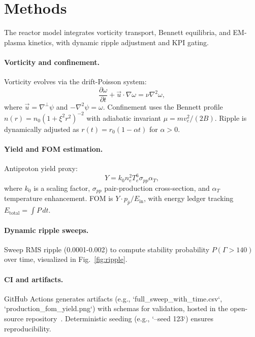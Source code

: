 \documentclass[11pt]{article}
\begin{document}
\section{Methods}
The reactor model integrates vorticity transport, Bennett equilibria, and EM-plasma kinetics, with dynamic ripple adjustment and KPI gating.

\paragraph{Vorticity and confinement.} Vorticity evolves via the drift-Poisson system:
\begin{equation}
\frac{\partial \omega}{\partial t} + \vec{u} \cdot \nabla \omega = \nu \nabla^2 \omega,
\end{equation}
where $\vec{u} = \nabla^\perp \psi$ and $-\nabla^2 \psi = \omega$. Confinement uses the Bennett profile $n(r)=n_0 (1 + \xi^2 r^2)^{-2}$ with adiabatic invariant $\mu = m v_c^2 / (2B)$. Ripple is dynamically adjusted as $r(t) = r_0 (1 - \alpha t)$ for $\alpha > 0$.

\paragraph{Yield and FOM estimation.} Antiproton yield proxy:
\begin{equation}
Y = k_0 n_e^2 T_e^6 \sigma_{pp} \alpha_T,
\end{equation}
where $k_0$ is a scaling factor, $\sigma_{pp}$ pair-production cross-section, and $\alpha_T$ temperature enhancement. FOM is $Y \cdot p_{\bar{p}} / E_{\text{in}}$, with energy ledger tracking $E_{\text{total}} = \int P \, dt$.

\paragraph{Dynamic ripple sweeps.} Sweep RMS ripple (0.0001-0.002) to compute stability probability $P(\Gamma > 140)$ over time, visualized in Fig.~\ref{fig:ripple}.

\paragraph{CI and artifacts.} GitHub Actions generates artifacts (e.g., `full\_sweep\_with\_time.csv`, `production\_fom\_yield.png`) with schemas for validation, hosted in the open-source repository~\cite{sherrington2025}. Deterministic seeding (e.g., `--seed 123`) ensures reproducibility.
\end{document}
